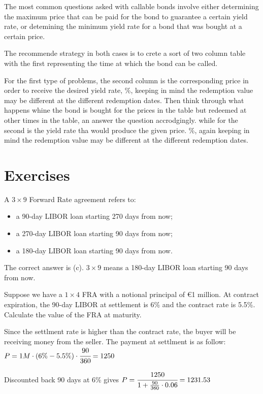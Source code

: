 \documentclass[12pt,a4paper]{book}
\begin{document}
The most common questions asked with callable bonds involve either determining the maximum price that can be paid for the bond to guarantee a certain yield rate, or detemining the minimum yield rate for a bond that was bought at a certain price.

The recommende strategy in both cases is to crete a sort of two column table with the first representing the time at which the bond can be called.

For the first type of problems, the second column is the corresponding price in order to receive the desired yield rate, \%, keeping in mind the redemption value may be different at the different redemption dates. Then think through what happens whine the bond is bought for the prices in the table but redeemed at other times in the table, an answer the question accrodgingly.
while for the second is the yield rate tha would produce the given price. \%, again keeping in mind the redemption value may be different at the different redemption dates.

\section*{Exercises}
\begin{exercise}[subtitle=Forward Rate Agreement]
A $3\times 9$ Forward Rate agreement refers to:
\begin{itemize}
\item a 90-day LIBOR loan starting 270 days from now;
\item a 270-day LIBOR loan starting 90 days from now;
\item a 180-day LIBOR loan starting 90 days from now.
\end{itemize}
\end{exercise}
\begin{solution}
The correct answer is (c). $3\times 9$ means a 180-day LIBOR loan starting 90 days from now.
\end{solution}

\begin{exercise}[subtitle=FRA Valuation]
Suppose we have a $1\times 4$ FRA with a notional principal of €1 million. 
At contract expiration, the 90-day LIBOR at settlement is 6\% and the contract rate is 5.5\%.
Calculate the value of the FRA at maturity.
\end{exercise}
\begin{solution}
Since the settlment rate is higher than the contract rate, the buyer will be receiving money from the seller. The payment at settlment is as follow:
$P = 1M\cdot(6\%-5.5\%)\cdot \cfrac{90}{360} = 1250$

Discounted back 90 days at 6\% gives
$P = \cfrac{1250}{1+\frac{90}{360}\cdot0.06} = 1231.53$
\end{solution}
\end{document}
